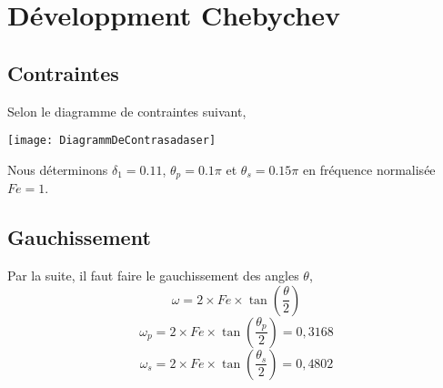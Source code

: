 \documentclass{article}
\begin{document}
\newpage

\section{Développment Chebychev}

\subsection{Contraintes}
Selon le diagramme de contraintes suivant,
\begin{center}
	\texttt{[image: DiagrammDeContrasadaser]}
\end{center}

Nous déterminons $\delta_1 = 0.11$, $\theta_p = 0.1\pi$ et $\theta_s = 0.15\pi$ en fréquence normalisée $Fe = 1$.
\newline
\subsection{Gauchissement}
Par la suite, il faut faire le gauchissement des angles $\theta$,
\newline
\begin{equation}
\omega = 2 \times Fe \times \tan(\frac{\theta}{2})
\end{equation}
\begin{equation}
\omega_p = 2 \times Fe \times \tan(\frac{\theta_p}{2}) = 0,3168
\end{equation}
\begin{equation}
\omega_s = 2 \times Fe \times \tan(\frac{\theta_s}{2}) = 0,4802
\end{equation}
\end{document}
